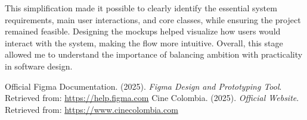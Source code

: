 \documentclass[12pt, letterpaper]{article}
\begin{document}
This simplification made it possible to clearly identify the essential system requirements, main user interactions, and core classes, while ensuring the project remained feasible. Designing the mockups helped visualize how users would interact with the system, making the flow more intuitive. Overall, this stage allowed me to understand the importance of balancing ambition with practicality in software design.

\begin{thebibliography}{2}
 Official Figma Documentation. (2025). \textit{Figma Design and Prototyping Tool}. Retrieved from: \url{https://help.figma.com}
 Cine Colombia. (2025). \textit{Official Website}. Retrieved from: \url{https://www.cinecolombia.com}
\end{thebibliography}
\end{document}

